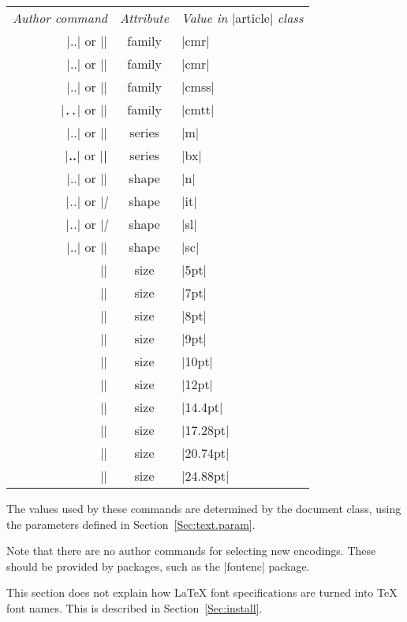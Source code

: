 \documentclass{ltxguide}[1995/11/28]
\begin{document}
\begin{center}
   \begin{tabular}{rcl}
      \emph{Author command} &
      \emph{Attribute} &
      \emph{Value in} |article| \emph{class} \\
      |\textnormal{..}| or |\normalfont|    & family & |cmr| \\
      |\textrm{..}| or |\rmfamily|    & family & |cmr| \\
      |\textsf{..}| or |\sffamily|    & family & |cmss| \\
      |\texttt{..}| or |\ttfamily|    & family & |cmtt| \\
      |\textmd{..}| or |\mdseries|    & series & |m| \\
      |\textbf{..}| or |\bfseries|    & series & |bx| \\
      |\textup{..}| or |\upshape|     & shape  & |n| \\
      |\textit{..}| or |\itshape|     & shape  & |it| \\
      |\textsl{..}| or |\slshape|     & shape  & |sl| \\
      |\textsc{..}| or |\scshape|     & shape  & |sc| \\
      |\tiny|         & size   & |5pt| \\
      |\scriptsize|   & size   & |7pt| \\
      |\footnotesize| & size   & |8pt| \\
      |\small|        & size   & |9pt| \\
      |\normalsize|   & size   & |10pt| \\
      |\large|        & size   & |12pt| \\
      |\Large|        & size   & |14.4pt| \\
      |\LARGE|        & size   & |17.28pt| \\
      |\huge|         & size   & |20.74pt| \\
      |\Huge|         & size   & |24.88pt|
   \end{tabular}
\end{center}
The values used by these commands are determined by the document class,
using the parameters defined in Section~\ref{Sec:text.param}.
 
Note that there are no author commands for selecting new encodings.
These should be provided by packages, such as the |fontenc| package.
 
This section does not explain how \LaTeX{} font specifications are
turned into \TeX{} font names.  This is described in
Section~\ref{Sec:install}.
 
\end{document}
